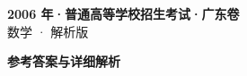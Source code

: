 \documentclass[zihao=-4, a4paper]{ctexart}
\begin{document}
\begin{center}
  {\Large\bfseries 2006 年·普通高等学校招生考试·广东卷}\\[4pt]
  {\large 数学 · 解析版}
\end{center}
\medskip
{}

\clearpage
{}
\begin{center}{\Large\bfseries 参考答案与详细解析}\end{center}
\medskip

\end{document}
